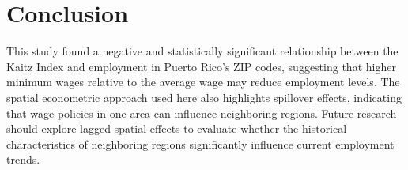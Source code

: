 \documentclass[12pt]{article}
\begin{document}
\section{Conclusion}

This study found a negative and statistically significant relationship between the Kaitz Index
and employment in Puerto Rico's ZIP codes, suggesting that higher minimum wages relative to the
average wage may reduce employment levels. The spatial econometric approach used here also
highlights spillover effects, indicating that wage policies in one area can influence neighboring
regions. Future research should explore lagged spatial effects to evaluate whether the historical
characteristics of neighboring regions significantly influence current employment trends.

\printbibliography
\end{document}
